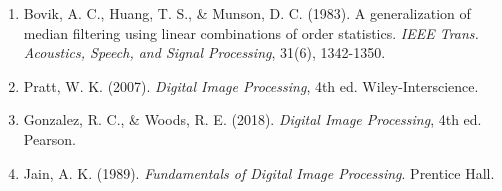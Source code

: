 \documentclass[a4paper, 11pt]{article}
\begin{document}
\begin{enumerate}
\item Bovik, A. C., Huang, T. S., \& Munson, D. C. (1983). A generalization of median filtering using linear combinations of order statistics. \textit{IEEE Trans. Acoustics, Speech, and Signal Processing}, 31(6), 1342-1350.
\item Pratt, W. K. (2007). \textit{Digital Image Processing}, 4th ed. Wiley-Interscience.
\item Gonzalez, R. C., \& Woods, R. E. (2018). \textit{Digital Image Processing}, 4th ed. Pearson.
\item Jain, A. K. (1989). \textit{Fundamentals of Digital Image Processing}. Prentice Hall.
\end{enumerate}
\end{document}
